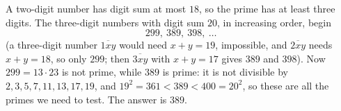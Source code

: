A two-digit number has digit sum at most $18$, so the prime has at least three digits. The three-digit numbers with digit sum $20$, in increasing order, begin
\[
299,\ 389,\ 398,\ \dots
\]
(a three-digit number $\overline{1xy}$ would need $x+y=19$, impossible, and $\overline{2xy}$ needs $x+y=18$, so only $299$; then $\overline{3xy}$ with $x+y=17$ gives $389$ and $398$). Now $299=13\cdot23$ is not prime, while $389$ is prime: it is not divisible by $2,3,5,7,11,13,17,19$, and $19^2=361<389<400=20^2$, so these are all the primes we need to test. The answer is $\boxed{389}$.
